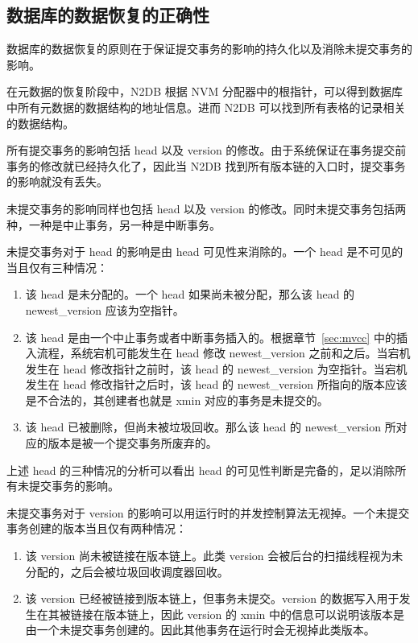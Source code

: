 \subsection{数据库的数据恢复的正确性}

数据库的数据恢复的原则在于保证提交事务的影响的持久化以及消除未提交事务的影响。

在元数据的恢复阶段中，N2DB 根据 NVM 分配器中的根指针，可以得到数据库中所有元数据的数据结构的地址信息。进而 N2DB 可以找到所有表格的记录相关的数据结构。

所有提交事务的影响包括 head 以及 version 的修改。由于系统保证在事务提交前事务的修改就已经持久化了，因此当 N2DB 找到所有版本链的入口时，提交事务的影响就没有丢失。

未提交事务的影响同样也包括 head 以及 version 的修改。同时未提交事务包括两种，一种是中止事务，另一种是中断事务。

未提交事务对于 head 的影响是由 head 可见性来消除的。一个 head 是不可见的当且仅有三种情况：
\begin{enumerate}
    \item 该 head 是未分配的。一个 head 如果尚未被分配，那么该 head 的 newest\_version 应该为空指针。
    \item 该 head 是由一个中止事务或者中断事务插入的。根据章节~\ref{sec:mvcc} 中的插入流程，系统宕机可能发生在 head 修改 newest\_version 之前和之后。当宕机发生在 head 修改指针之前时，该 head 的 newest\_version 为空指针。当宕机发生在 head 修改指针之后时，该 head 的 newest\_version 所指向的版本应该是不合法的，其创建者也就是 xmin 对应的事务是未提交的。
    \item 该 head 已被删除，但尚未被垃圾回收。那么该 head 的 newest\_version 所对应的版本是被一个提交事务所废弃的。
\end{enumerate}
上述 head 的三种情况的分析可以看出 head 的可见性判断是完备的，足以消除所有未提交事务的影响。

未提交事务对于 version 的影响可以用运行时的并发控制算法无视掉。一个未提交事务创建的版本当且仅有两种情况：
\begin{enumerate}
    \item 该 version 尚未被链接在版本链上。此类 version 会被后台的扫描线程视为未分配的，之后会被垃圾回收调度器回收。
    \item 该 version 已经被链接到版本链上，但事务未提交。version 的数据写入用于发生在其被链接在版本链上，因此 version 的 xmin 中的信息可以说明该版本是由一个未提交事务创建的。因此其他事务在运行时会无视掉此类版本。
\end{enumerate}

